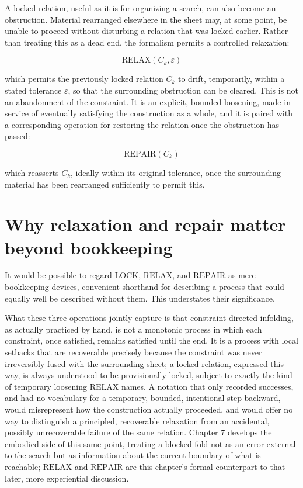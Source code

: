 \documentclass[11pt,oneside]{book}
\begin{document}
A locked relation, useful as it is for organizing a search, can also
become an obstruction. Material rearranged elsewhere in the sheet may,
at some point, be unable to proceed without disturbing a relation that
was locked earlier. Rather than treating this as a dead end, the
formalism permits a controlled relaxation:

\[\text{RELAX}(C_k, \varepsilon)\]

which permits the previously locked relation \(C_k\) to drift,
temporarily, within a stated tolerance \(\varepsilon\), so that the
surrounding obstruction can be cleared. This is not an abandonment of
the constraint. It is an explicit, bounded loosening, made in service of
eventually satisfying the construction as a whole, and it is paired with
a corresponding operation for restoring the relation once the
obstruction has passed:

\[\text{REPAIR}(C_k)\]

which reasserts \(C_k\), ideally within its original tolerance, once the
surrounding material has been rearranged sufficiently to permit this.

\hypertarget{why-relaxation-and-repair-matter-beyond-bookkeeping}{%
\section{Why relaxation and repair matter beyond
bookkeeping}\label{why-relaxation-and-repair-matter-beyond-bookkeeping}}

It would be possible to regard \(\text{LOCK}\), \(\text{RELAX}\), and
\(\text{REPAIR}\) as mere bookkeeping devices, convenient shorthand for
describing a process that could equally well be described without them.
This understates their significance.

What these three operations jointly capture is that constraint-directed
infolding, as actually practiced by hand, is not a monotonic process in
which each constraint, once satisfied, remains satisfied until the end.
It is a process with local setbacks that are recoverable precisely
because the constraint was never irreversibly fused with the surrounding
sheet; a locked relation, expressed this way, is always understood to be
provisionally locked, subject to exactly the kind of temporary loosening
\(\text{RELAX}\) names. A notation that only recorded successes, and had
no vocabulary for a temporary, bounded, intentional step backward, would
misrepresent how the construction actually proceeded, and would offer no
way to distinguish a principled, recoverable relaxation from an
accidental, possibly unrecoverable failure of the same relation. Chapter
7 develops the embodied side of this same point, treating a blocked fold
not as an error external to the search but as information about the
current boundary of what is reachable; \(\text{RELAX}\) and
\(\text{REPAIR}\) are this chapter's formal counterpart to that later,
more experiential discussion.
\end{document}
